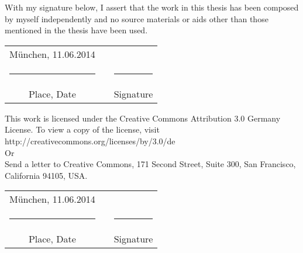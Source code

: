 \thispagestyle{plain}


\vspace*{1cm}
With my signature below, I assert that the work in this thesis has been composed by myself independently and no source materials or aids other than those mentioned in the thesis have been used.



\vspace{2cm}

\hspace{1cm}\begin{tabular}{ccc}
\vspace{-0.3cm}München, 11.06.2014 	&\hspace{4cm} 		& \\
\rule{4.5cm}{0.4pt}					&					&\rule{4.5cm}{0.4pt}\\
Place, Date							&					& Signature			
\end{tabular}

           		






\vspace{4cm}
This work is licensed under the Creative Commons Attribution 3.0 Germany License. To view a copy of the license, visit http://creativecommons.org/licenses/by/3.0/de\\

Or\\

Send a letter to Creative Commons, 171 Second Street, Suite 300, San Francisco, California 94105, USA.

\vspace{2cm}



\hspace{1cm}\begin{tabular}{ccc}
\vspace{-0.3cm}München, 11.06.2014 	&\hspace{4cm} 		& \\
\rule{4.5cm}{0.4pt}					&					&\rule{4.5cm}{0.4pt}\\
Place, Date							&					& Signature	
\end{tabular}